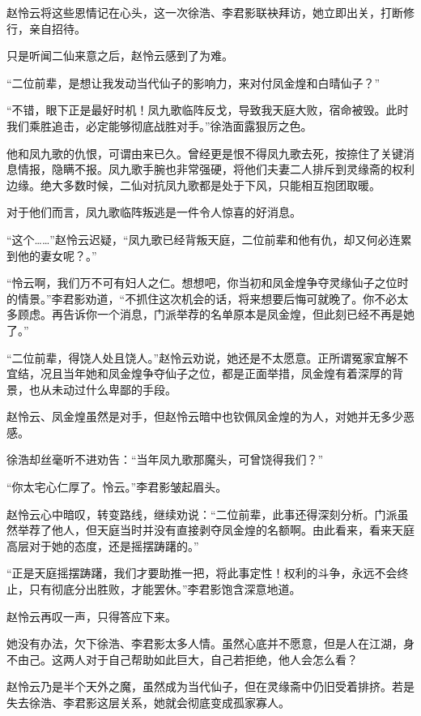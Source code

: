 \begin{this_body}
赵怜云将这些恩情记在心头，这一次徐浩、李君影联袂拜访，她立即出关，打断修行，亲自招待。

只是听闻二仙来意之后，赵怜云感到了为难。

“二位前辈，是想让我发动当代仙子的影响力，来对付凤金煌和白晴仙子？”

“不错，眼下正是最好时机！凤九歌临阵反戈，导致我天庭大败，宿命被毁。此时我们乘胜追击，必定能够彻底战胜对手。”徐浩面露狠厉之色。

他和凤九歌的仇恨，可谓由来已久。曾经更是恨不得凤九歌去死，按捺住了关键消息情报，隐瞒不报。凤九歌手腕也非常强硬，将他们夫妻二人排斥到灵缘斋的权利边缘。绝大多数时候，二仙对抗凤九歌都是处于下风，只能相互抱团取暖。

对于他们而言，凤九歌临阵叛逃是一件令人惊喜的好消息。

“这个……”赵怜云迟疑，“凤九歌已经背叛天庭，二位前辈和他有仇，却又何必连累到他的妻女呢？。”

“怜云啊，我们万不可有妇人之仁。想想吧，你当初和凤金煌争夺灵缘仙子之位时的情景。”李君影劝道，“不抓住这次机会的话，将来想要后悔可就晚了。你不必太多顾虑。再告诉你一个消息，门派举荐的名单原本是凤金煌，但此刻已经不再是她了。”

“二位前辈，得饶人处且饶人。”赵怜云劝说，她还是不太愿意。正所谓冤家宜解不宜结，况且当年她和凤金煌争夺仙子之位，都是正面举措，凤金煌有着深厚的背景，也从未动过什么卑鄙的手段。

赵怜云、凤金煌虽然是对手，但赵怜云暗中也钦佩凤金煌的为人，对她并无多少恶感。

徐浩却丝毫听不进劝告：“当年凤九歌那魔头，可曾饶得我们？”

“你太宅心仁厚了。怜云。”李君影皱起眉头。

赵怜云心中暗叹，转变路线，继续劝说：“二位前辈，此事还得深刻分析。门派虽然举荐了他人，但天庭当时并没有直接剥夺凤金煌的名额啊。由此看来，看来天庭高层对于她的态度，还是摇摆踌躇的。”

“正是天庭摇摆踌躇，我们才要助推一把，将此事定性！权利的斗争，永远不会终止，只有彻底分出胜败，才能罢休。”李君影饱含深意地道。

赵怜云再叹一声，只得答应下来。

她没有办法，欠下徐浩、李君影太多人情。虽然心底并不愿意，但是人在江湖，身不由己。这两人对于自己帮助如此巨大，自己若拒绝，他人会怎么看？

赵怜云乃是半个天外之魔，虽然成为当代仙子，但在灵缘斋中仍旧受着排挤。若是失去徐浩、李君影这层关系，她就会彻底变成孤家寡人。


\end{this_body}
